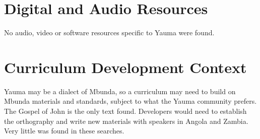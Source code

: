 \documentclass[12pt]{article}
\begin{document}
\section{Digital and Audio Resources}
No audio, video or software resources specific to Yauma were found.

\section{Curriculum Development Context}
Yauma may be a dialect of Mbunda, so a curriculum may need to build on Mbunda materials and standards, subject to what the Yauma community prefers. The Gospel of John is the only text found. Developers would need to establish the orthography and write new materials with speakers in Angola and Zambia. Very little was found in these searches.
\end{document}
